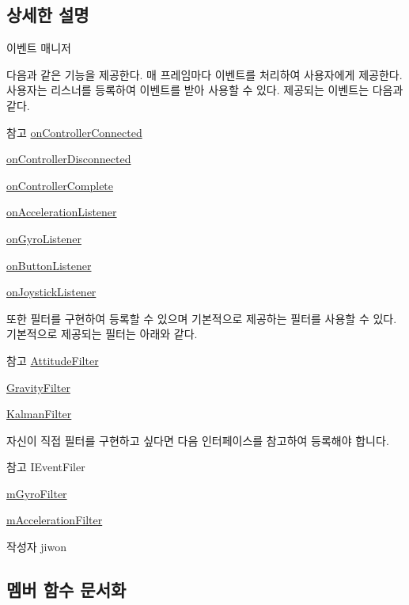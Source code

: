 \subsection{상세한 설명}
이벤트 매니저

다음과 같은 기능을 제공한다. 매 프레임마다 이벤트를 처리하여 사용자에게 제공한다. 사용자는 리스너를 등록하여 이벤트를 받아 사용할 수 있다. 제공되는 이벤트는 다음과 같다. \begin{DoxySeeAlso}{참고}
\hyperlink{class_event_manager_a1982ee974be3949930955adbf2b69416}{on\+Controller\+Connected} 

\hyperlink{class_event_manager_a8f4ec7cfc6f0ca0d4a5872997b359861}{on\+Controller\+Disconnected} 

\hyperlink{class_event_manager_af12f0caee161b1b2222cfd13cd957750}{on\+Controller\+Complete} 

\hyperlink{class_event_manager_a653a885d332bd10bf53a1f8e6a8c36cd}{on\+Acceleration\+Listener} 

\hyperlink{class_event_manager_a31f1da96e98896421b0026df5ce01623}{on\+Gyro\+Listener} 

\hyperlink{class_event_manager_a6f4d5e2ed1262c99f3295743878ba681}{on\+Button\+Listener} 

\hyperlink{class_event_manager_ab148217093b03a8cd7c962a11195c83a}{on\+Joystick\+Listener}
\end{DoxySeeAlso}
또한 필터를 구현하여 등록할 수 있으며 기본적으로 제공하는 필터를 사용할 수 있다. 기본적으로 제공되는 필터는 아래와 같다. \begin{DoxySeeAlso}{참고}
\hyperlink{class_attitude_filter}{Attitude\+Filter} 

\hyperlink{class_gravity_filter}{Gravity\+Filter} 

\hyperlink{class_kalman_filter}{Kalman\+Filter}
\end{DoxySeeAlso}
자신이 직접 필터를 구현하고 싶다면 다음 인터페이스를 참고하여 등록해야 합니다. \begin{DoxySeeAlso}{참고}
I\+Event\+Filer 

\hyperlink{class_event_manager_a7cee85488f5d7220c102cd945b1f494a}{m\+Gyro\+Filter} 

\hyperlink{class_event_manager_a2e8707f51be09be7f400bd9cca230b3a}{m\+Acceleration\+Filter}
\end{DoxySeeAlso}
\begin{DoxyAuthor}{작성자}
jiwon 
\end{DoxyAuthor}


\subsection{멤버 함수 문서화}
\hypertarget{class_event_manager_ac459bcb4ba4f140243e271628f8d366c}{}
